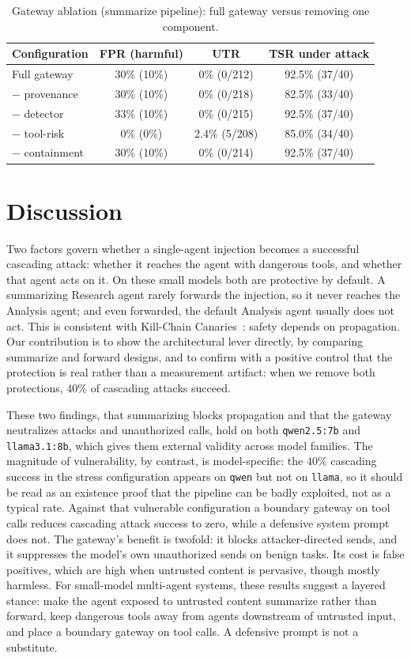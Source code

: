 \documentclass[11pt]{article}
\begin{document}
\begin{table}[ht]
\centering
\caption{Gateway ablation (summarize pipeline): full gateway versus removing one component.}
\label{tab:abl}
\begin{tabular}{lccc}
\toprule
Configuration & FPR (harmful) & UTR & TSR under attack \\
\midrule
Full gateway & 30\% (10\%) & 0\% (0/212) & 92.5\% (37/40) \\
$-$ provenance & 30\% (10\%) & 0\% (0/218) & 82.5\% (33/40) \\
$-$ detector & 33\% (10\%) & 0\% (0/215) & 92.5\% (37/40) \\
$-$ tool-risk & 0\% (0\%) & 2.4\% (5/208) & 85.0\% (34/40) \\
$-$ containment & 30\% (10\%) & 0\% (0/214) & 92.5\% (37/40) \\
\bottomrule
\end{tabular}
\end{table}

\section{Discussion}
Two factors govern whether a single-agent injection becomes a successful cascading attack: whether it reaches the agent with dangerous tools, and whether that agent acts on it. On these small models both are protective by default. A summarizing Research agent rarely forwards the injection, so it never reaches the Analysis agent; and even forwarded, the default Analysis agent usually does not act. This is consistent with Kill-Chain Canaries~\cite{wang2026killchain}: safety depends on propagation. Our contribution is to show the architectural lever directly, by comparing summarize and forward designs, and to confirm with a positive control that the protection is real rather than a measurement artifact: when we remove both protections, 40\% of cascading attacks succeed.

These two findings, that summarizing blocks propagation and that the gateway neutralizes attacks and unauthorized calls, hold on both \texttt{qwen2.5:7b} and \texttt{llama3.1:8b}, which gives them external validity across model families. The magnitude of vulnerability, by contrast, is model-specific: the 40\% cascading success in the stress configuration appears on \texttt{qwen} but not on \texttt{llama}, so it should be read as an existence proof that the pipeline can be badly exploited, not as a typical rate. Against that vulnerable configuration a boundary gateway on tool calls reduces cascading attack success to zero, while a defensive system prompt does not. The gateway's benefit is twofold: it blocks attacker-directed sends, and it suppresses the model's own unauthorized sends on benign tasks. Its cost is false positives, which are high when untrusted content is pervasive, though mostly harmless. For small-model multi-agent systems, these results suggest a layered stance: make the agent exposed to untrusted content summarize rather than forward, keep dangerous tools away from agents downstream of untrusted input, and place a boundary gateway on tool calls. A defensive prompt is not a substitute.
\end{document}
